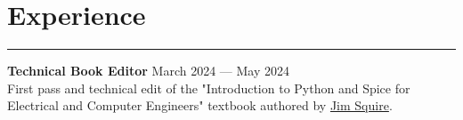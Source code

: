 \documentclass[a4paper,11pt]{article}
\begin{document}
\vspace{-0.8cm}
\section*{\hspace*{1em} Experience}
\vspace{-0.27cm}
\hrule
\vspace{0.3cm}
\textbf{\hspace*{1em}Technical Book Editor} 
\hfill March 2024 — May 2024 \\
First pass and technical edit of the "Introduction to Python and Spice for Electrical and Computer Engineers" textbook authored by \href{https://www.jimsquire.com/}{Jim Squire}. \\

\vspace{-0.8cm}
\end{document}

